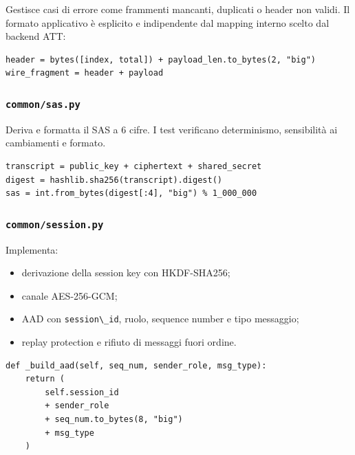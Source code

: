 \documentclass[11pt,a4paper]{article}
\providecommand{\tightlist}{\setlength{\itemsep}{0pt}\setlength{\parskip}{0pt}}
\newcommand{\passthrough}[1]{#1}
\begin{document}
Gestisce casi di errore come frammenti mancanti, duplicati o header non
validi. Il formato applicativo è esplicito e indipendente dal mapping
interno scelto dal backend ATT:

\begin{lstlisting}[style=pythonstyle,caption={Header applicativo dei frammenti PQ-BLE.}]
header = bytes([index, total]) + payload_len.to_bytes(2, "big")
wire_fragment = header + payload
\end{lstlisting}

\subsubsection{\texorpdfstring{\texttt{common/sas.py}}{common/sas.py}}\label{commonsas.py}

Deriva e formatta il SAS a 6 cifre. I test verificano determinismo,
sensibilità ai cambiamenti e formato.

\begin{lstlisting}[style=pythonstyle,caption={Derivazione del SAS dalla trascrizione.}]
transcript = public_key + ciphertext + shared_secret
digest = hashlib.sha256(transcript).digest()
sas = int.from_bytes(digest[:4], "big") % 1_000_000
\end{lstlisting}

\subsubsection{\texorpdfstring{\texttt{common/session.py}}{common/session.py}}\label{commonsession.py}

Implementa:

\begin{itemize}
\tightlist
\item
  derivazione della session key con HKDF-SHA256;
\item
  canale AES-256-GCM;
\item
  AAD con \passthrough{\lstinline!session\_id!}, ruolo, sequence number
  e tipo messaggio;
\item
  replay protection e rifiuto di messaggi fuori ordine.
\end{itemize}

\begin{lstlisting}[style=pythonstyle,caption={Costruzione dell'Additional Authenticated Data.}]
def _build_aad(self, seq_num, sender_role, msg_type):
    return (
        self.session_id
        + sender_role
        + seq_num.to_bytes(8, "big")
        + msg_type
    )
\end{lstlisting}
\end{document}
